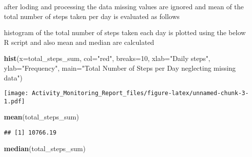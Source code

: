 \documentclass[]{article}
\newenvironment{Shaded}{\begin{snugshade}}{\end{snugshade}}
\newcommand{\KeywordTok}[1]{\textcolor[rgb]{0.13,0.29,0.53}{\textbf{#1}}}
\newcommand{\DataTypeTok}[1]{\textcolor[rgb]{0.13,0.29,0.53}{#1}}
\newcommand{\DecValTok}[1]{\textcolor[rgb]{0.00,0.00,0.81}{#1}}
\newcommand{\StringTok}[1]{\textcolor[rgb]{0.31,0.60,0.02}{#1}}
\newcommand{\OtherTok}[1]{\textcolor[rgb]{0.56,0.35,0.01}{#1}}
\newcommand{\OperatorTok}[1]{\textcolor[rgb]{0.81,0.36,0.00}{\textbf{#1}}}
\newcommand{\NormalTok}[1]{#1}
\begin{document}
after loding and processing the data missing values are ignored and mean
of the total number of steps taken per day is evaluated as follows

\begin{Shaded}
\end{Shaded}

histogram of the total number of steps taken each day is plotted using
the below R script and also mean and median are calculated

\begin{Shaded}
\begin{Highlighting}[]
\KeywordTok{hist}\NormalTok{(}\DataTypeTok{x=}\NormalTok{total_steps_sum,}
     \DataTypeTok{col=}\StringTok{"red"}\NormalTok{,}
     \DataTypeTok{breaks=}\DecValTok{10}\NormalTok{,}
     \DataTypeTok{xlab=}\StringTok{"Daily steps"}\NormalTok{,}
     \DataTypeTok{ylab=}\StringTok{"Frequency"}\NormalTok{,}
     \DataTypeTok{main=}\StringTok{"Total Number of Steps per Day neglecting missing data"}\NormalTok{)}
\end{Highlighting}
\end{Shaded}

\texttt{[image: Activity\_Monitoring\_Report\_files/figure-latex/unnamed-chunk-3-1.pdf]}

\begin{Shaded}
\begin{Highlighting}[]
\KeywordTok{mean}\NormalTok{(total_steps_sum)}
\end{Highlighting}
\end{Shaded}

\begin{verbatim}
## [1] 10766.19
\end{verbatim}

\begin{Shaded}
\begin{Highlighting}[]
\KeywordTok{median}\NormalTok{(total_steps_sum)}
\end{Highlighting}
\end{Shaded}
\end{document}
